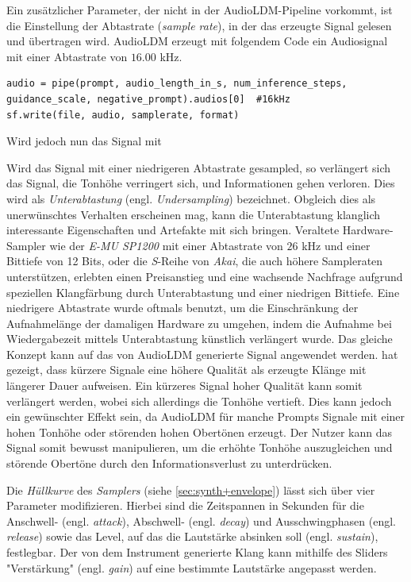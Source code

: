 \documentclass[
  a4paper,  %
  twoside,  %
  bibliography=totoc,
  headsepline,
  cleardoublepage=empty,
  parskip=half,
  draft=false
]{scrbook}
\begin{document}
Ein zusätzlicher Parameter, der nicht in der AudioLDM-Pipeline\cite{liu_audioldm_2023} vorkommt, ist die Einstellung der Abtastrate (\emph{sample rate}), in der das erzeugte Signal gelesen und übertragen wird. AudioLDM erzeugt mit folgendem Code ein Audiosignal mit einer Abtastrate von $16.00$ kHz. 

\lstset{basicstyle=\ttfamily, keywordstyle=\bfseries}

\begin{lstlisting}
audio = pipe(prompt, audio_length_in_s, num_inference_steps, guidance_scale, negative_prompt).audios[0]  #16kHz
sf.write(file, audio, samplerate, format)
\end{lstlisting}

Wird jedoch nun das Signal mit 



Wird das Signal mit einer niedrigeren Abtastrate gesampled, so verlängert sich das Signal, die Tonhöhe verringert sich, und Informationen gehen verloren. Dies wird als \emph{Unterabtastung} (engl. \emph{Undersampling}) bezeichnet. Obgleich dies als unerwünschtes Verhalten erscheinen mag, kann die Unterabtastung klanglich interessante Eigenschaften und Artefakte mit sich bringen. Veraltete Hardware-Sampler wie der \emph{E-MU SP1200} mit einer Abtastrate von $26$ kHz und einer Bittiefe von 12 Bits, oder die \emph{S}-Reihe von \emph{Akai}, die auch höhere Sampleraten unterstützen, erlebten einen Preisanstieg und eine wachsende Nachfrage aufgrund speziellen Klangfärbung durch Unterabtastung und einer niedrigen Bittiefe. Eine niedrigere Abtastrate wurde oftmals benutzt, um die Einschränkung der Aufnahmelänge der damaligen Hardware zu umgehen, indem die Aufnahme bei Wiedergabezeit mittels Unterabtastung künstlich verlängert wurde. Das gleiche Konzept kann auf das von AudioLDM generierte Signal angewendet werden. \cite{liu_audioldm_2023} hat gezeigt, dass kürzere Signale eine höhere Qualität als erzeugte Klänge mit längerer Dauer aufweisen. Ein kürzeres Signal hoher Qualität kann somit verlängert werden, wobei sich allerdings die Tonhöhe vertieft. Dies kann jedoch ein gewünschter Effekt sein, da AudioLDM für manche Prompts Signale mit einer hohen Tonhöhe oder störenden hohen Obertönen erzeugt. Der Nutzer kann das Signal somit bewusst manipulieren, um die erhöhte Tonhöhe auszugleichen und störende Obertöne durch den Informationsverlust zu unterdrücken.

Die \emph{Hüllkurve} des \emph{Samplers} (siehe \ref{sec:synth+envelope}) lässt sich über vier Parameter modifizieren. Hierbei sind die Zeitspannen in Sekunden für die Anschwell- (engl. \emph{attack}), Abschwell- (engl. \emph{decay}) und Ausschwingphasen (engl. \emph{release}) sowie das Level, auf das die Lautstärke absinken soll (engl. \emph{sustain}), festlegbar. Der von dem Instrument generierte Klang kann mithilfe des Sliders "Verstärkung" (engl. \emph{gain}) auf eine bestimmte Lautstärke angepasst werden.
\end{document}
